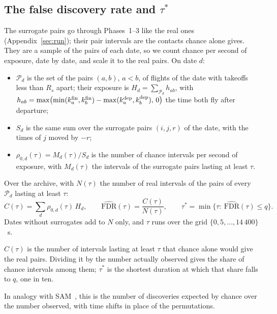 \subsection{The false discovery rate and \texorpdfstring{$\tau^*$}{tau*}}\label{sec:fdr}

The surrogate pairs go through Phases~1--3 like the real ones (Appendix~\ref{sec:run}); their pair
intervals are the contacts chance alone gives. They are a sample of the pairs of each date, so we
count chance per second of exposure, date by date, and scale it to the real pairs. On date $d$:
\begin{itemize}
\item $\mathcal{P}_d$ is the set of the pairs $(a,b)$, $a<b$, of flights of the date with
  takeoffs less than $R_s$ apart; their exposure is $H_d=\sum_{\mathcal{P}_d}h_{ab}$, with
  $h_{ab}=\max\bigl(\min(k^{\mathrm{fin}}_a,k^{\mathrm{fin}}_b)-\max(k^{\mathrm{dep}}_a,k^{\mathrm{dep}}_b),\,0\bigr)$ the time both fly
  after departure;
\item $S_d$ is the same sum over the surrogate pairs $(i,j,r)$ of the date, with the times of $j$
  moved by $-r$;
\item $\rho_{0,d}(\tau)=M_d(\tau)/S_d$ is the number of chance intervals per second of exposure,
  with $M_d(\tau)$ the intervals of the surrogate pairs lasting at least $\tau$.
\end{itemize}
Over the archive, with $N(\tau)$ the number of real intervals of the pairs of every
$\mathcal{P}_d$ lasting at least $\tau$:
\begin{equation}\label{eq:fdr}
  C(\tau)=\sum_d \rho_{0,d}(\tau)\,H_d,\qquad
  \widehat{\mathrm{FDR}}(\tau)=\frac{C(\tau)}{N(\tau)},\qquad
  \tau^*=\min\bigl\{\tau:\ \widehat{\mathrm{FDR}}(\tau)\le q\bigr\}.
\end{equation}
Dates without surrogates add to $N$ only, and $\tau$ runs over the grid $\{0,5,\dots,14\,400\}$~s.

\begin{inwords}
$C(\tau)$ is the number of intervals lasting at least $\tau$ that chance alone would give the
real pairs. Dividing it by the number actually observed gives the share of chance intervals among
them; $\tau^*$ is the shortest duration at which that share falls to $q$, one in ten.
\end{inwords}

In analogy with SAM~\cite{tusher2001}, this is the number of discoveries expected by chance over
the number observed, with time shifts in place of the permutations.

